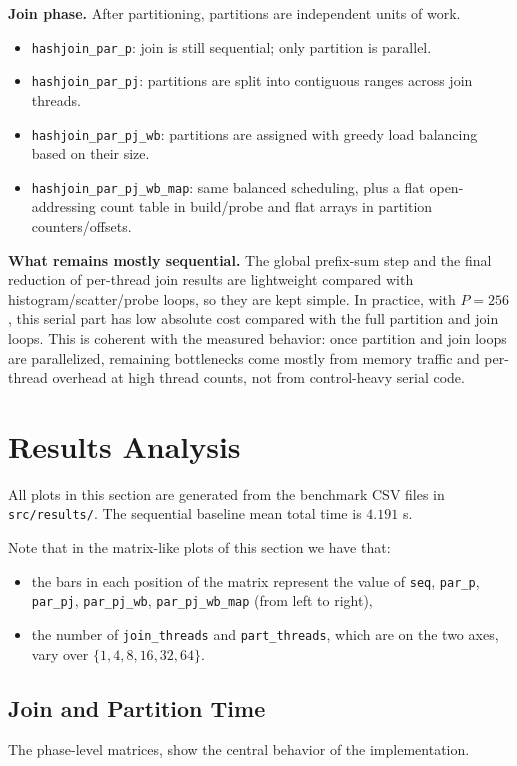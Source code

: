 \documentclass[11pt,a4paper]{article}
\begin{document}
\textbf{Join phase.}
After partitioning, partitions are independent units of work.
\begin{itemize}
    \item \texttt{hashjoin\_par\_p}: join is still sequential; only partition is parallel.
    \item \texttt{hashjoin\_par\_pj}: partitions are split into contiguous ranges across join threads.
    \item \texttt{hashjoin\_par\_pj\_wb}: partitions are assigned with greedy load balancing based on their size.
    \item \texttt{hashjoin\_par\_pj\_wb\_map}: same balanced scheduling, plus a flat open-addressing count table in build/probe and flat arrays in partition counters/offsets.
\end{itemize}

\textbf{What remains mostly sequential.}
The global prefix-sum step and the final reduction of per-thread join results are lightweight compared with histogram/scatter/probe loops, so they are kept simple. In practice, with \(P=256\), this serial part has low absolute cost compared with the full partition and join loops. This is coherent with the measured behavior: once partition and join loops are parallelized, remaining bottlenecks come mostly from memory traffic and per-thread overhead at high thread counts, not from control-heavy serial code.


\section{Results Analysis}
All plots in this section are generated from the benchmark CSV files in \texttt{src/results/}.  
The sequential baseline mean total time is \(4.191\) s.

Note that in the matrix-like plots of this section we have that:
\begin{itemize}
    \item the bars in each position of the matrix represent the value of \texttt{seq}, \texttt{par\_p}, \texttt{par\_pj}, \texttt{par\_pj\_wb}, \texttt{par\_pj\_wb\_map} (from left to right),
    \item the number of \texttt{join\_threads} and \texttt{part\_threads}, which are on the two axes, vary over \(\{1,4,8,16,32,64\}\).
\end{itemize}

\subsection{Join and Partition Time}
The phase-level matrices, show the central behavior of the implementation.
\end{document}
